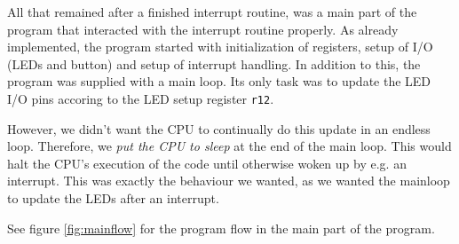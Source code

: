 All that remained after a finished interrupt routine, was a main part of
the program that interacted with the interrupt routine properly. As
already implemented, the program started with initialization of
registers, setup of I/O (LEDs and button) and setup of interrupt
handling. In addition to this, the program was supplied with a main
loop. Its only task was to update the LED I/O pins accoring to the LED
setup register \texttt{r12}.

However, we didn't want the CPU to continually do this update in an
endless loop. Therefore, we \emph{put the CPU to sleep} at the end of
the main loop. This would halt the CPU's execution of the code until
otherwise woken up by e.g. an interrupt. This was exactly the behaviour
we wanted, as we wanted the mainloop to update the LEDs after an
interrupt.

See figure \ref{fig:mainflow} for the program flow in the main part of
the program.


